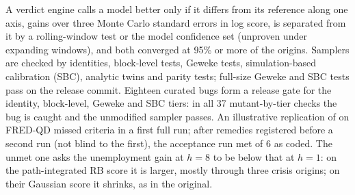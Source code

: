 A verdict engine calls a model better only if it differs from its reference along one axis, gains over three Monte Carlo standard errors in log score, is separated from it by a rolling-window test or the model confidence set (unproven under expanding windows), and both converged at 95\% or more of the origins. %
Samplers are checked by identities, block-level tests, Geweke tests, simulation-based calibration (SBC), analytic twins and parity tests; full-size Geweke and SBC tests pass on the release commit. %
Eighteen curated bugs form a release gate for the identity, block-level, Geweke and SBC tiers: in all 37 mutant-by-tier checks the bug is caught and the unmodified sampler passes. %
An illustrative replication of \citet{clark2015macroeconomic} on FRED-QD missed  criteria in a first full run; after remedies registered before a second run (not blind to the first), the acceptance run met  of 6 as coded. %
The unmet one asks the unemployment gain at $h = 8$ to be below that at $h = 1$: on the path-integrated RB score it is larger, mostly through three crisis origins; on their Gaussian score it shrinks, as in the original. %
